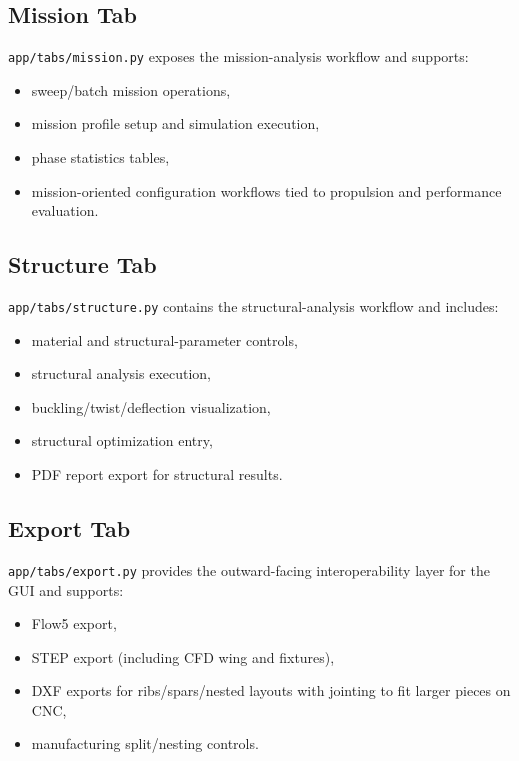 \subsection{Mission Tab}
\texttt{app/tabs/mission.py} exposes the mission-analysis workflow and supports:
\begin{itemize}
\item sweep/batch mission operations,
\item mission profile setup and simulation execution,
\item phase statistics tables,
\item mission-oriented configuration workflows tied to propulsion and performance evaluation.
\end{itemize}

\subsection{Structure Tab}
\texttt{app/tabs/structure.py} contains the structural-analysis workflow and includes:
\begin{itemize}
\item material and structural-parameter controls,
\item structural analysis execution,
\item buckling/twist/deflection visualization,
\item structural optimization entry,
\item PDF report export for structural results.
\end{itemize}

\subsection{Export Tab}
\texttt{app/tabs/export.py} provides the outward-facing interoperability layer for the GUI and supports:
\begin{itemize}
\item Flow5 export,
\item STEP export (including CFD wing and fixtures),
\item DXF exports for ribs/spars/nested layouts with jointing to fit larger pieces on CNC,
\item manufacturing split/nesting controls.
\end{itemize}

